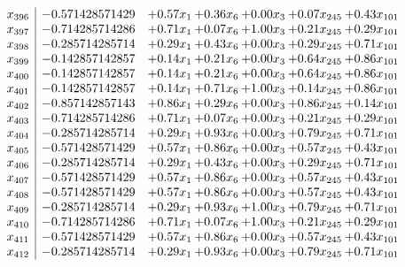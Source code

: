 \documentclass[8pt]{article}
\begin{document}
\[\begin{array}{c| c c@{\hskip 2pt} c@{\hskip 2pt} c@{\hskip 2pt} c@{\hskip 2pt} c@{\hskip 2pt} }
 x_{396}   &  -0.571428571429 & +  0.57 x_{1} & +  0.36 x_{6} & +  0.00 x_{3} & +  0.07 x_{245} & +  0.43 x_{101}\\
 x_{397}   &  -0.714285714286 & +  0.71 x_{1} & +  0.07 x_{6} & +  1.00 x_{3} & +  0.21 x_{245} & +  0.29 x_{101}\\
 x_{398}   &  -0.285714285714 & +  0.29 x_{1} & +  0.43 x_{6} & +  0.00 x_{3} & +  0.29 x_{245} & +  0.71 x_{101}\\
 x_{399}   &  -0.142857142857 & +  0.14 x_{1} & +  0.21 x_{6} & +  0.00 x_{3} & +  0.64 x_{245} & +  0.86 x_{101}\\
 x_{400}   &  -0.142857142857 & +  0.14 x_{1} & +  0.21 x_{6} & +  0.00 x_{3} & +  0.64 x_{245} & +  0.86 x_{101}\\
 x_{401}   &  -0.142857142857 & +  0.14 x_{1} & +  0.71 x_{6} & +  1.00 x_{3} & +  0.14 x_{245} & +  0.86 x_{101}\\
 x_{402}   &  -0.857142857143 & +  0.86 x_{1} & +  0.29 x_{6} & +  0.00 x_{3} & +  0.86 x_{245} & +  0.14 x_{101}\\
 x_{403}   &  -0.714285714286 & +  0.71 x_{1} & +  0.07 x_{6} & +  0.00 x_{3} & +  0.21 x_{245} & +  0.29 x_{101}\\
 x_{404}   &  -0.285714285714 & +  0.29 x_{1} & +  0.93 x_{6} & +  0.00 x_{3} & +  0.79 x_{245} & +  0.71 x_{101}\\
 x_{405}   &  -0.571428571429 & +  0.57 x_{1} & +  0.86 x_{6} & +  0.00 x_{3} & +  0.57 x_{245} & +  0.43 x_{101}\\
 x_{406}   &  -0.285714285714 & +  0.29 x_{1} & +  0.43 x_{6} & +  0.00 x_{3} & +  0.29 x_{245} & +  0.71 x_{101}\\
 x_{407}   &  -0.571428571429 & +  0.57 x_{1} & +  0.86 x_{6} & +  0.00 x_{3} & +  0.57 x_{245} & +  0.43 x_{101}\\
 x_{408}   &  -0.571428571429 & +  0.57 x_{1} & +  0.86 x_{6} & +  0.00 x_{3} & +  0.57 x_{245} & +  0.43 x_{101}\\
 x_{409}   &  -0.285714285714 & +  0.29 x_{1} & +  0.93 x_{6} & +  1.00 x_{3} & +  0.79 x_{245} & +  0.71 x_{101}\\
 x_{410}   &  -0.714285714286 & +  0.71 x_{1} & +  0.07 x_{6} & +  1.00 x_{3} & +  0.21 x_{245} & +  0.29 x_{101}\\
 x_{411}   &  -0.571428571429 & +  0.57 x_{1} & +  0.86 x_{6} & +  0.00 x_{3} & +  0.57 x_{245} & +  0.43 x_{101}\\
 x_{412}   &  -0.285714285714 & +  0.29 x_{1} & +  0.93 x_{6} & +  0.00 x_{3} & +  0.79 x_{245} & +  0.71 x_{101}\\

\end{array}\]
\end{document}
